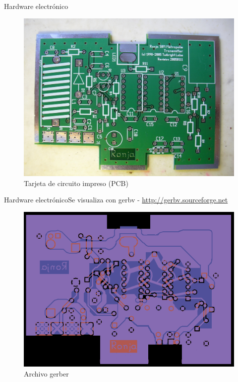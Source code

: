 \documentclass{beamer}
\begin{document}
\begin{frame}{Hardware electrónico}
  \begin{figure}
    \includegraphics[scale=0.85]{transmisor/1b5e}
    \caption{Tarjeta de circuito impreso (PCB)}
  \end{figure}
\end{frame}

\begin{frame}{Hardware electrónico}{Se visualiza con \alert{gerbv} - \url{http://gerbv.sourceforge.net}}
  \begin{figure}
    \includegraphics[scale=0.4]{transmisor/transmisor_gerber.png}
    \caption{Archivo gerber}
  \end{figure}
\end{frame}
\end{document}
